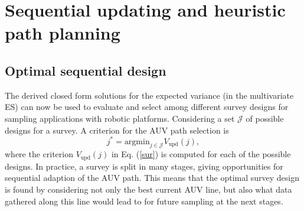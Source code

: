 \documentclass[aoas]{imsart}
\begin{document}





\section{Sequential updating and heuristic path planning}\label{sec:heuristics}

\subsection{Optimal sequential design}
\label{myopic}

The derived closed form solutions for the expected variance (in the multivariate ES) can now be used to evaluate and select among different survey designs for sampling applications with robotic platforms. 
Considering a set $\mathcal{J}$ of possible designs for a survey. A criterion for the AUV path selection is
\begin{equation}\label{crit}
    j^* = \mbox{argmin}_{j \in \mathcal{J}} V_{\mbox{upd}}(j),
\end{equation}
where the criterion $V_{\mbox{upd}}(j)$ in Eq. (\ref{sur}) is computed for each of the possible designs. 
In practice, a survey is split in many stages, giving opportunities for sequential adaption of the AUV path. This means that the optimal survey design is found by considering not only the best current AUV line, but also what data gathered along this line would lead to for future sampling at the next stages. 
\end{document}
